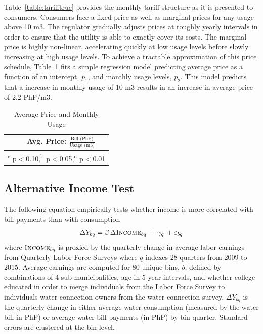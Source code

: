 \documentclass[12pt,table]{article}
\begin{document}
Table~\ref{table:tarifftrue} provides the monthly tariff structure as it is presented to consumers.  Consumers face a fixed price as well as marginal prices for any usage above 10 m3.  The regulator gradually adjusts prices at roughly yearly intervals in order to ensure that the utility is able to exactly cover its costs.  The marginal price is highly non-linear, accelerating quickly at low usage levels before slowly increasing at high usage levels.  To achieve a tractable approximation of this price schedule, Table~\ref{table:tcd_predict} fits a simple regression model predicting average price as a function of an intercept, $p_1$, and monthly usage levels, $p_2$.  This model predicts that a increase in monthly usage of 10 m3 results in an increase in average price of 2.2 PhP/m3.  

\begin{table}[H]
\small
\centering
\caption{Average Price and Monthly Usage}\label{table:tcd_predict}
\vspace{-2mm}
\begin{tabular}{lc}
\toprule
& \small Avg. Price: $\frac{\text{Bill (PhP)}}{\text{Usage (m3)}}$    \\
\midrule 

\bottomrule
\multicolumn{2}{l}{\scriptsize \textsuperscript{c} p$<$0.10,\textsuperscript{b} p$<$0.05,\textsuperscript{a} p$<$0.01 }
\end{tabular}
\end{table}




\subsection{Alternative Income Test}\label{appendix:alternativeincome}

The following equation empirically tests whether income is more correlated with bill payments than with consumption
\begin{align*}
\Delta Y_{bq} = \beta\, \Delta \textsc{Income}_{bq} \,+\, \gamma_q \,+\varepsilon_{bq}
\end{align*}
where $\textsc{Income}_{bq}$ is proxied by the quarterly change in average labor earnings from Quarterly Labor Force Surveys where $q$ indexes 28 quarters from 2009 to 2015.  Average earnings are computed for 80 unique bins, $b$, defined by combinations of 4 sub-municipalities, age in 5 year intervals, and whether college educated in order to merge individuals from the Labor Force Survey to individuals water connection owners from the water connection survey.  $\Delta Y_{bq}$ is the quarterly change in either average water consumption (measured by the water bill in PhP) or average water bill payments (in PhP) by bin-quarter.  Standard errors are clustered at the bin-level.
\end{document}
